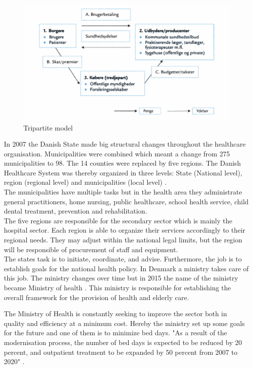 \begin{figure}[H]
\centering
\includegraphics[width=1\textwidth]{Figure/tredjepart.png}
\caption{Tripartite model \cite{sundhedsvaesen}}
\label{Trepartmodel}
\end{figure} 

In 2007 the Danish State made big structural changes throughout the healthcare organisation. Municipalities were combined which meant a change from 275 municipalities to 98. The 14 counties were replaced by five regions. The Danish Healthcare System was thereby organized in three levels: State (National level), region (regional level) and municipalities (local level) \cite{indenrigs, Healthcareindk2}.\\
The municipalities have multiple tasks but in the health area they administrate general practitioners, home nursing, public healthcare, school health service, child dental treatment, prevention and rehabilitation\cite{sundhedsministeriet}. \\
The five regions are responsible for the secondary sector which is mainly the hospital sector. Each region is able to organize their services accordingly to their regional needs. They may adjust within the national legal limits, but the region will be responsible of procurement of staff and equipment.\\
The states task is to initiate, coordinate, and advise. Furthermore, the job is to establish goals for the national health policy\cite{sundhedsministeriet}. In Denmark a ministry takes care of this job. The ministry changes over time but in 2015 the name of the ministry became Ministry of health \cite{ministryofhealth}. This ministry is responsible for establishing the overall framework for the provision of health and elderly care.

The Ministry of Health is constantly seeking to improve the sector both in quality and efficiency at a minimum cost. Hereby the ministry set up some goals for the future and one of them is to minimize bed days. "As a result of the modernisation process, the number of bed days is expected to be reduced by 20 percent, and outpatient treatment to be expanded by 50 percent from 2007 to 2020" \cite{Healthcareindk2}. %


